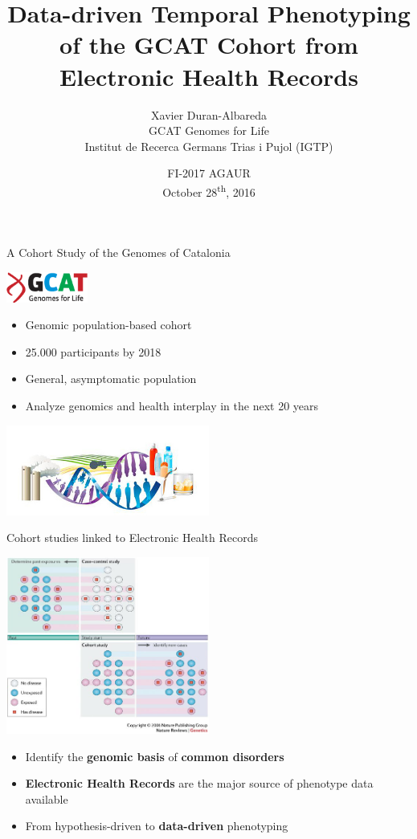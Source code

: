 \documentclass[ignorenonframetext,]{beamer}
\title{Data-driven Temporal Phenotyping\\
of the GCAT Cohort from Electronic Health Records}
\author{Xavier Duran-Albareda\\
GCAT Genomes for Life\\
Institut de Recerca Germans Trias i Pujol (IGTP)}
\date{FI-2017 AGAUR\\
October 28\textsuperscript{th}, 2016}
\providecommand{\tightlist}{%
\setlength{\itemsep}{0pt}\setlength{\parskip}{0pt}}
\begin{document}
\frame{\titlepage}

\begin{frame}{A Cohort Study of the Genomes of Catalonia}

\includegraphics[keepaspectratio,width=0.2\textwidth]{images/logo-GCAT.png}

\begin{itemize}
\tightlist
\item
  Genomic population-based cohort
\item
  25.000 participants by 2018
\item
  General, asymptomatic population
\item
  Analyze genomics and health interplay in the next 20 years
\end{itemize}

\includegraphics[keepaspectratio,width=0.5\textwidth]{images/chronic_disease_epidemiology_group_image.jpg}

\end{frame}

\begin{frame}{Cohort studies linked to Electronic Health Records}

\includegraphics[keepaspectratio,width=0.5\textwidth]{images/case_control_nature.jpeg}

\begin{itemize}
\tightlist
\item
  Identify the \textbf{genomic basis} of \textbf{common disorders}
\item
  \textbf{Electronic Health Records} are the major source of phenotype
  data available
\item
  From hypothesis-driven to \textbf{data-driven} phenotyping
\end{itemize}

\end{frame}
\end{document}
